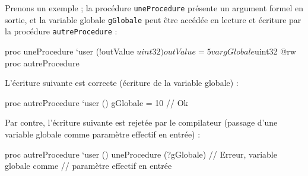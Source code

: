 Prenons un exemple ; la procédure \texttt{uneProcedure} présente un argument formel en sortie, et la variable globale \texttt{gGlobale} peut être accédée en lecture et écriture par la procédure \texttt{autreProcedure} :
\begin{PLM}
proc uneProcedure `user (!outValue $uint32) {
  outValue = 5
}

var gGlobale $uint32 {
  @rw proc autreProcedure
}
\end{PLM}

L'écriture suivante est correcte (écriture de la variable globale) :
\begin{PLM}
proc autreProcedure `user () {
  gGlobale = 10 // Ok
}
\end{PLM}


Par contre, l'écriture suivante est rejetée par le compilateur (passage d'une variable globale comme paramètre effectif en entrée) :
\begin{PLM}
proc autreProcedure `user () {
  uneProcedure (?gGlobale) // Erreur, variable globale comme
                           // paramètre effectif en entrée
}
\end{PLM}

